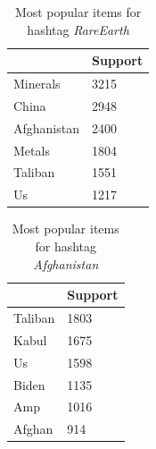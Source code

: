 \documentclass[12pt,%
               a4paper,%
               oneside,openany,%
               titlepage,%
               headinclude,footinclude,%
               BCOR5mm,%
               cleardoublepage=empty,%
               tablecaptionabove,%
               floatperchapter,
               ]{scrreprt}                 %
\begin{document}
\begin{table}[]
\caption{Most popular items for hashtag \textit{RareEarth}}
\begin{center}
\begin{tabular}{l|l}
            & \textbf{Support} \\ \hline
Minerals    & 3215    \\ \hline
China       & 2948    \\ \hline
Afghanistan & 2400    \\ \hline
Metals      & 1804    \\ \hline
Taliban     & 1551    \\ \hline
Us          & 1217
\label{POP_RareEarth}
\end{tabular}
\end{center}
\end{table}

\begin{table}[]
\caption{Most popular items for hashtag \textit{Afghanistan}}
\begin{center}
\begin{tabular}{l|l}
        & \textbf{Support} \\ \hline
Taliban & 1803 \\ \hline
Kabul   & 1675 \\ \hline
Us      & 1598 \\ \hline
Biden   & 1135 \\ \hline
Amp     & 1016 \\ \hline
Afghan  & 914
\label{POP_Afghanistan}
\end{tabular}
\end{center}
\end{table}
\end{document}

